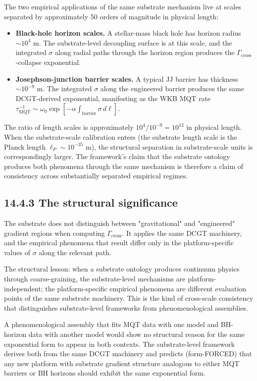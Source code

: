 \documentclass[11pt]{book}
\begin{document}
The two empirical applications of the same substrate mechanism live at scales separated by approximately 50 orders of magnitude in physical length:

\begin{itemize}
\item \textbf{Black-hole horizon scales.} A stellar-mass black hole has horizon radius $\sim 10^{4}$ m. The substrate-level decoupling surface is at this scale, and the integrated $\sigma$ along radial paths through the horizon region produces the $\Gamma_\mathrm{cross}$-collapse exponential.
\item \textbf{Josephson-junction barrier scales.} A typical JJ barrier has thickness $\sim 10^{-9}$ m. The integrated $\sigma$ along the engineered barrier produces the same DCGT-derived exponential, manifesting as the WKB MQT rate $\tau_\mathrm{MQT}^{-1} \sim \omega_0\exp[-\alpha\int_\mathrm{barrier}\sigma\,d\ell]$.
\end{itemize}

The ratio of length scales is approximately $10^{4}/10^{-9} = 10^{13}$ in physical length. When the substrate-scale calibration enters (the substrate length scale is the Planck length $\ell_P \sim 10^{-35}$ m), the structural separation in substrate-scale units is correspondingly larger. The framework's claim that the substrate ontology produces both phenomena through the same mechanism is therefore a claim of consistency across substantially separated empirical regimes.

\subsection{14.4.3 The structural significance}

The substrate does not distinguish between "gravitational" and "engineered" gradient regions when computing $\Gamma_\mathrm{cross}$. It applies the same DCGT machinery, and the empirical phenomena that result differ only in the platform-specific values of $\sigma$ along the relevant path.

The structural lesson: when a substrate ontology produces continuum physics through coarse-graining, the substrate-level mechanisms are platform-independent; the platform-specific empirical phenomena are different evaluation points of the same substrate machinery. This is the kind of cross-scale consistency that distinguishes substrate-level frameworks from phenomenological assemblies.

A phenomenological assembly that fits MQT data with one model and BH-horizon data with another model would show no structural reason for the same exponential form to appear in both contexts. The substrate-level framework derives both from the same DCGT machinery and predicts (form-FORCED) that any new platform with substrate gradient structure analogous to either MQT barriers or BH horizons should exhibit the same exponential form.
\end{document}
